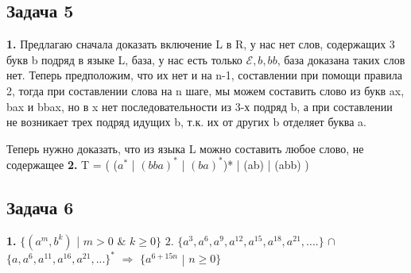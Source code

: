 \documentclass[a4paper,14pt]{article} %
\begin{document}
\subsection{Задача 5}
\textbf{1.} Предлагаю сначала доказать включение L в R, у нас нет слов, содержащих 3 букв b подряд в языке L, база, у нас есть только $\mathcal{E}, b, bb$, база доказана таких слов нет.
Теперь предположим, что их нет и на n-1, составлении при помощи правила 2, тогда при составлении слова на n шаге, мы можем составить слово из букв ax, bax и bbax, но в x нет последовательности 
из 3-х подряд b, а при составлении не возникает трех подряд идущих b, т.к. их от других b отделяет буква a. 

Теперь нужно доказать, что из языка L можно составить любое слово, не содержащее
\newline
\textbf{2.} T = ( ($a^{*}$ | $(bba)^{*}$ | $(ba)^{*}$)* | (ab) | (abb) )
\subsection{Задача 6}
\textbf{1.} $\{(a^{m}, b^{k})$ | $m > 0$ \& $k \geq 0 \}$
\newline 
$2.$ $\{a^3, a^6, a^9, a^{12}, a^{15}, a^{18}, a^{21}, .... \}$ $\cap$  
$\{a, a^6, a^{11}, a^{16}, a^{21}, ... \}^{*}$ 
$\Longrightarrow$ $\{ a^{6+15n}$ | $n \geq 0 \}$
\end{document}
